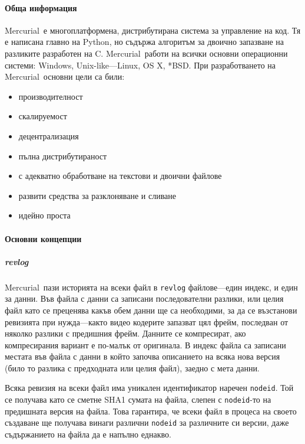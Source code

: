 \documentclass[a4paper]{article}
\def\Hg{Mercurial}
\begin{document}
    \paragraph{Обща информация}
    \Hg\ е многоплатформена, дистрибутирана система за управление на код. Тя
    е написана главно на Python, но съдържа алгоритъм за двоично
    запазване на разликите разработен на C. \Hg\ работи на всички основни
    операционни системи: Windows, Unix-like---Linux, OS X, *BSD. При
    разработването на \Hg\ основни цели са били:
    \begin{itemize}
      \item производителност
      \item скалируемост
      \item децентрализация
      \item пълна дистрибутираност
      \item с адекватно обработване на текстови и двоични файлове
      \item развити средства за разклоняване и сливане
      \item идейно проста
    \end{itemize}

    \paragraph{Основни концепции}
    \subparagraph{revlog}
    \Hg\ пази историята на всеки файл в \texttt{revlog} файлове---един индекс,
    и един за данни. Във файла с данни са записани последователни разлики, или
    целия файл като се преценява какъв обем данни ще са необходими, за да се
    възстанови ревизията при нужда---както видео кодерите запазват цял фрейм,
    последван от няколко разлики с предишния фрейм. Данните се компресират, ако
    компресирания вариант е по-малък от оригинала. В индекс файла са записани
    местата във файла с данни в който започва описанието на всяка нова версия
    (било то разлика с предходната или целия файл), заедно с мета данни.

    Всяка ревизия на всеки файл има уникален идентификатор наречен
    \texttt{nodeid}. Той се получава като се сметне SHA1\cite{sha1} сумата на файла,
    слепен с \texttt{nodeid}-то на предишната версия на файла. Това гарантира,
    че всеки файл в процеса на своето създаване ще получава винаги различни
    \texttt{nodeid} за различните си версии, даже съдържанието на файла да
    е напълно еднакво.
    \vspace{5 mm}
\end{document}

